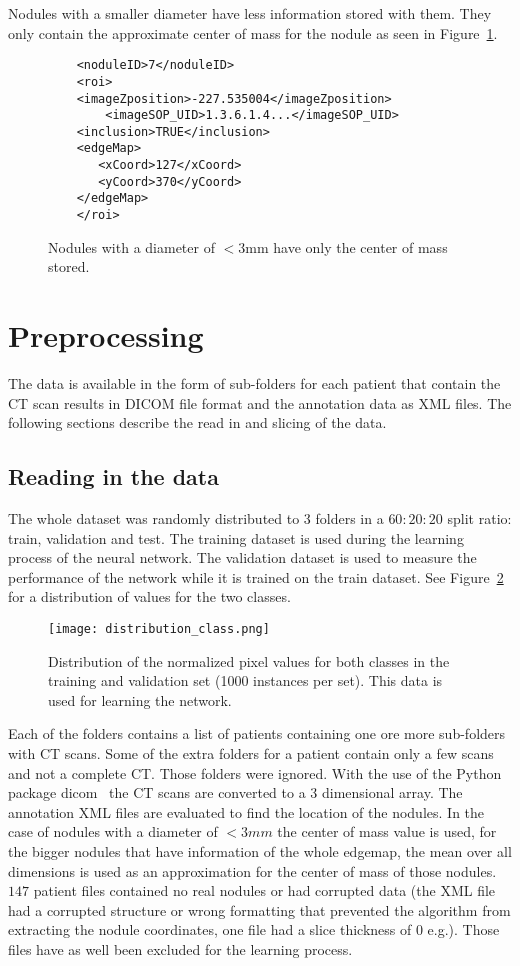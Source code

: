 \documentclass[../Thesis.tex]{subfiles}
\begin{document}
Nodules with a smaller diameter have less information stored with them. They only contain the approximate center of mass for the nodule as seen in Figure~\ref{fig:smallNod}.

\begin{figure}
\begin{lstlisting}
	<noduleID>7</noduleID>
	<roi>
	<imageZposition>-227.535004</imageZposition>
        <imageSOP_UID>1.3.6.1.4...</imageSOP_UID>
	<inclusion>TRUE</inclusion>
	<edgeMap>
	   <xCoord>127</xCoord>
	   <yCoord>370</yCoord>
	</edgeMap>
	</roi>
\end{lstlisting}
\caption{Nodules with a diameter of $<3$mm have only the center of mass stored.}
\label{fig:smallNod}
\end{figure}

\section{Preprocessing}
The data is available in the form of sub-folders for each patient that contain the CT scan results in DICOM file format and the annotation data as XML files. The following sections describe the read in and slicing of the data.

\subsection{Reading in the data}
The whole dataset was randomly distributed to 3 folders in a $60:20:20$ split ratio: train, validation and test. The training dataset is used during the learning process of the neural network. The validation dataset is used to measure the performance of the network while it is trained on the train dataset. See Figure~\ref{fig:ttdist} for a distribution of values for the two classes.
 
\begin{figure}
\texttt{[image: distribution\_class.png]}
\caption{Distribution of the normalized pixel values for both classes in the training and validation set (1000 instances per set). This data is used for learning the network.}
\label{fig:ttdist}
\end{figure}

Each of the folders contains a list of patients containing one ore more sub-folders with CT scans. Some of the extra folders for a patient contain only a few scans and not a complete CT. Those folders were ignored. With the use of the Python package dicom~\cite{mason2011t} the CT scans are converted to a 3 dimensional array. The annotation XML files are evaluated to find the location of the nodules. In the case of nodules with a diameter of $<3mm$ the center of mass value is used, for the bigger nodules that have information of the whole edgemap, the mean over all dimensions is used as an approximation for the center of mass of those nodules. 
$147$ patient files contained no real nodules or had corrupted data (the XML file had a corrupted structure or wrong formatting that prevented the algorithm from extracting the nodule coordinates, one file had a slice thickness of $0$ e.g.). Those files have as well been excluded for the learning process.
\end{document}
